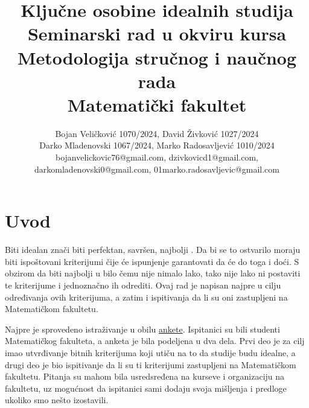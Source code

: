 \documentclass[a4paper]{article}
\begin{document}
\title{Ključne osobine idealnih studija\\ \small{Seminarski rad u okviru kursa\\Metodologija stručnog i naučnog rada\\ Matematički fakultet}}

\author{Bojan Veličković 1070/2024, David Živković 1027/2024\\ Darko Mladenovski 1067/2024, Marko Radosavljević 1010/2024\\bojanvelickovic76@gmail.com, dzivkovicd1@gmail.com,\\ darkomladenovski0@gmail.com, 01marko.radosavljevic@gmail.com}



\maketitle


\tableofcontents

\newpage

\section{Uvod}
\label{sec:uvod}

Biti idealan znači biti perfektan, savršen, najbolji \cite{ideal}. Da bi se to ostvarilo moraju biti ispoštovani kriterijumi čije će ispunjenje garantovati da će do toga i doći. S obzirom da biti najbolji u bilo čemu nije nimalo lako, tako nije lako ni postaviti te kriterijume i jednoznačno ih odrediti. Ovaj rad je napisan najpre u cilju određivanja ovih kriterijuma, a zatim i ispitivanja da li su oni zastupljeni na Matematičkom fakultetu.

Najpre je sprovedeno istraživanje u obilu \href{https://github.com/zdavid01/IdealneStudije/blob/main/IdealneStudije(Responses).xlsx}{ankete}. Ispitanici su bili studenti Matematičkog fakulteta, a anketa je bila podeljena u dva dela. Prvi deo je za cilj imao utvrđivanje bitnih kriterijuma koji utiču na to da studije budu idealne, a drugi deo je bio ispitivanje da li su ti kriterijumi zastupljeni na Matematičkom fakultetu. Pitanja su mahom bila usredsređena na kurseve i organizaciju na fakultetu, uz mogućnost da ispitanici sami dodaju svoja mišljenja i predloge ukoliko smo nešto izostavili. 
\end{document}
